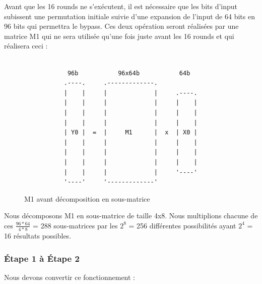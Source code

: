 \documentclass[a4paper,12pt]{article}
\begin{document}
Avant que les 16 rounds ne s'exécutent, il est nécessaire que les bits d'input subissent une permutation initiale suivie d'une expansion de l'input de 64 bits en 96 bits qui permettra le bypass.
Ces deux opération seront réalisées par une matrice M1 qui ne sera utilisée qu'une fois juste avant les 16 rounds et qui réalisera ceci :

\begin{figure}[h]
\begin{verbatim}

            96b           96x64b           64b
           .----.     .-------------. 
           |    |     |             |     .----.
           |    |     |             |     |    |
           |    |     |             |     |    |
           |    |     |             |     |    |
           | Y0 |  =  |     M1      |  x  | X0 |
           |    |     |             |     |    |
           |    |     |             |     |    |
           |    |     |             |     |    |
           |    |     |             |     '----'
           '----'     '-------------'

\end{verbatim}
\caption{M1 avant décomposition en sous-matrice}
\label{fig:ascii-box}
\end{figure}

\clearpage

Nous décomposons M1 en sous-matrice de taille 4x8. Nous multiplions chacune de ces $\frac{96*64}{4*8}$ = 288 sous-matrices par les $2^8$ = 256 différentes possibilités ayant $2^4$ = 16 résultats possibles.


\subsubsection{Étape 1 à Étape 2}

Nous devons convertir ce fonctionnement :
\end{document}
